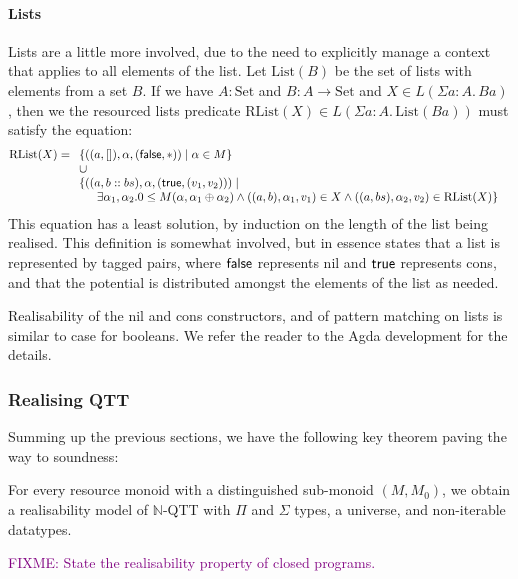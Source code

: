 \documentclass[acmsmall,review]{acmart}
\newcommand{\Set}{\mathrm{Set}}
\newcommand{\bob}[1]{\textcolor{purple}{FIXME: #1}}
\begin{document}
\paragraph{Lists} Lists are a little more involved, due to the need to
explicitly manage a context that applies to all elements of the
list. Let $\mathrm{List}(B)$ be the set of lists with elements from a
set $B$. If we have $A : \Set$ and $B : A \to \Set$ and
$X \in L(\Sigma a:A.\, B a)$, then we the resourced lists predicate
$\mathrm{RList}(X) \in L(\Sigma a : A.\, \mathrm{List}(B a))$ must
satisfy the equation:
\begin{displaymath}
  \mathrm{RList}(X) =
  \begin{array}[t]{l}
    \{ ((a, []), \alpha, (\synFalse, *)) \mid \alpha \in M \} \\
    \cup \\
    \{ \begin{array}[t]{@{}l}
         ((a, b :: bs), \alpha, (\synTrue, (v_1, v_2))) \mid \\
         \quad \exists \alpha_1, \alpha_2. 0 \leq M(\alpha, \alpha_1 \oplus \alpha_2) \land ((a, b), \alpha_1, v_1) \in X \land ((a, bs), \alpha_2, v_2) \in \mathrm{RList}(X) \}
       \end{array}
  \end{array}
\end{displaymath}
This equation has a least solution, by induction on the length of the
list being realised. This definition is somewhat involved, but in
essence states that a list is represented by tagged pairs, where
$\mathsf{false}$ represents nil and $\mathsf{true}$ represents cons, and that
the potential is distributed amongst the elements of the list as
needed.

Realisability of the nil and cons constructors, and of pattern
matching on lists is similar to case for booleans. We refer the reader
to the Agda development for the details.

\subsubsection{Realising QTT}

Summing up the previous sections, we have the following key theorem
paving the way to soundness:
\begin{theorem}\label{thm:basic-qtt-realisability-model}
  For every resource monoid with a distinguished sub-monoid
  $(M, M_0)$, we obtain a realisability model of $\mathbb{N}$-QTT with
  $\Pi$ and $\Sigma$ types, a universe, and non-iterable datatypes.

  \bob{State the realisability property of closed programs.}
\end{theorem}
\end{document}
